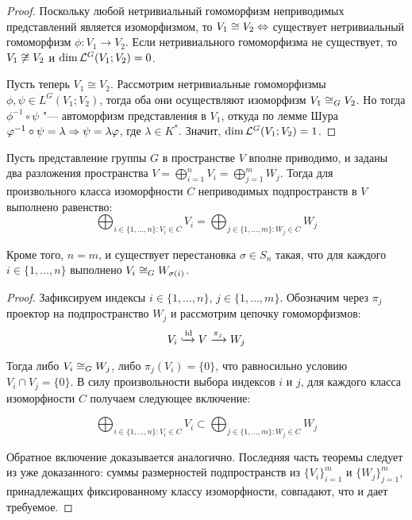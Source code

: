 \begin{proof}
	Поскольку любой нетривиальный гомоморфизм неприводимых представлений является изоморфизмом, то $V_1 \cong V_2 \Leftrightarrow$ существует нетривиальный гомоморфизм $\phi : V_1 \to V_2$. Если нетривиального гомоморфизма не существует, то $V_1\centernot\cong V_2$ и $\dim{\mathcal L^G(V_1; V_2)} = 0$.
	
	Пусть теперь $V_1 \cong V_2$. Рассмотрим нетривиальные гомоморфизмы $\phi, \psi \in L^G(V_1; V_2)$, тогда оба они осуществляют изоморфизм $V_1 \cong_G V_2$. Но тогда $\phi^{-1}\circ\psi$ "--- автоморфизм представления в $V_1$, откуда по лемме Шура $\varphi^{-1}\circ\psi = \lambda \Rightarrow \psi = \lambda \varphi$, где $\lambda \in K^*$. Значит, $\dim{\mathcal L^G(V_1; V_2)} = 1$.
\end{proof}

\begin{theorem}
	Пусть представление группы $G$ в пространстве $V$ вполне приводимо, и заданы два разложения пространства $V = \bigoplus_{i = 1}^nV_i = \bigoplus_{j = 1}^mW_j$. Тогда для произвольного класса изоморфности $C$ неприводимых подпространств в $V$ выполнено равенство:
	\[\bigoplus_{i \in \{1, \dotsc, n\} : V_i \in C}V_i = \bigoplus_{j \in \{1, \dotsc, m\}: W_j \in C}W_j\]
	
	Кроме того, $n = m$, и существует перестановка $\sigma \in S_n$ такая, что для каждого $i \in \{1, \dotsc, n\}$ выполнено $V_i \cong_G W_{\sigma(i)}$.
\end{theorem}

\begin{proof}
	Зафиксируем индексы $i\in \{1, \dotsc, n\}$, $j \in \{1, \dotsc, m\}$. Обозначим через $\pi_j$ проектор на подпространство $W_j$ и рассмотрим цепочку гомоморфизмов:
	\[V_i \xhookrightarrow[]{\mathrm{id}} V \xrightarrow{\pi_j} W_j\]
	
	Тогда либо $V_i \cong_G W_j$, либо $\pi_j(V_i) = \{0\}$, что равносильно условию $V_i \cap V_j = \{0\}$. \pagebreak В силу произвольности выбора индексов $i$ и $j$, для каждого класса изоморфности $C$ получаем  следующее включение:
	
	\[\bigoplus_{i \in \{1, \dotsc, n\} : V_i \in C}V_i \subset \bigoplus_{j \in \{1, \dotsc, m\}: W_j \in C}W_j\]
	
	Обратное включение доказывается аналогично. Последняя часть теоремы следует из уже доказанного: суммы размерностей подпространств из $\{V_i\}_{i = 1}^m$ и $\{W_j\}_{j = 1}^m$, принадлежащих фиксированному классу изоморфности, совпадают, что и дает требуемое.
\end{proof}

